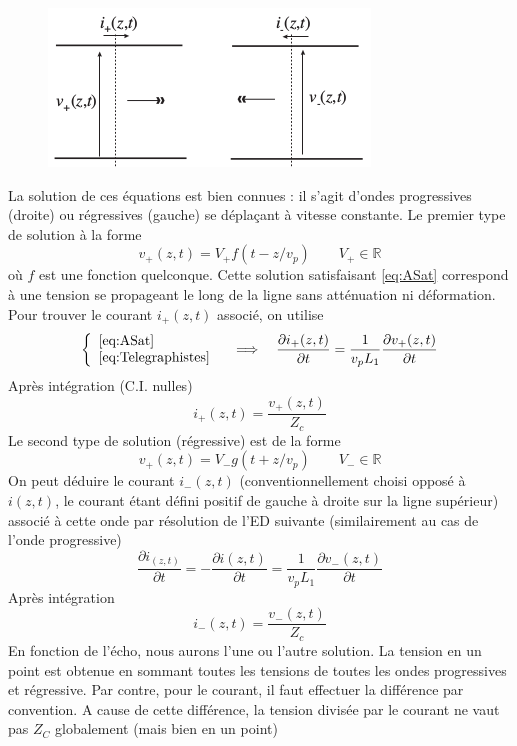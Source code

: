 \begin{figure}
	\vspace{-5mm}
	\includegraphics[scale=0.35]{ch2/image5.png}
\end{figure}
La solution de ces équations est bien connues : il s'agit d'ondes progressives (droite) ou 
régressives (gauche) se déplaçant à vitesse constante. Le premier type de solution à la 
forme
\begin{equation}
v_+(z,t) = V_+f(t-z/v_p)\qquad V_+\in\mathbb{R}
\end{equation}
où $f$ est une fonction quelconque. Cette solution satisfaisant \autoref{eq:ASat} correspond 
à une tension se propageant le long de la ligne sans atténuation ni déformation. Pour trouver 
le courant $i_+(z,t)$ associé, on utilise
\begin{equation}
\left\{\begin{array}{l}
\autoref{eq:ASat}\\
\autoref{eq:Telegraphistes}
\end{array}\right.\quad\Longrightarrow\quad \dfrac{\partial i_+(z,t)}{\partial t} = 
\dfrac{1}{v_pL_1}\dfrac{\partial v_+(z,t)}{\partial t}
\end{equation}
Après intégration (C.I. nulles)
\begin{equation}
i_+(z,t) = \dfrac{v_+(z,t)}{Z_c}
\end{equation}
Le second type de solution (régressive) est de la forme
\begin{equation}
v_+(z,t) = V_-g(t+z/v_p)\qquad V_-\in\mathbb{R}
\end{equation}
On peut déduire le courant $i_-(z,t)$ (conventionnellement choisi opposé à $i(z,t)$, 
le courant étant défini positif de gauche à droite sur la ligne supérieur) associé à 
cette onde par résolution de l'ED suivante (similairement au cas de l'onde progressive)
\begin{equation}
\dfrac{\partial i_(z,t)}{\partial t} = -
\dfrac{\partial i(z,t)}{\partial t} = \dfrac{1}{v_pL_1}\dfrac{\partial v_-(z,t)}{\partial t}
\end{equation}
Après intégration
\begin{equation}
i_-(z,t) = \dfrac{v_-(z,t)}{Z_c}
\end{equation}
En fonction de l'écho, nous aurons l'une ou l'autre solution. La tension en un point est 
obtenue en sommant toutes les tensions de toutes les ondes progressives et régressive. Par 
contre, pour le courant, il faut effectuer la différence par convention. A cause de cette 
différence, la tension divisée par le courant ne vaut pas $Z_C$ globalement (mais bien en 
un point)


